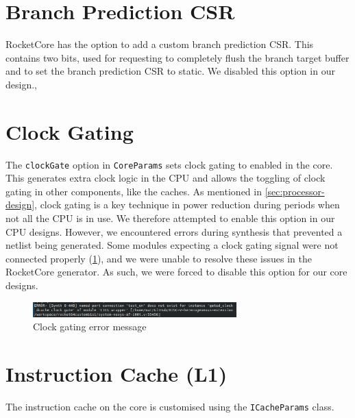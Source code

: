 \section{Branch Prediction CSR}
RocketCore has the option to add a custom branch prediction CSR. This contains two bits, used for requesting to completely flush the branch target buffer and to set the branch prediction CSR to static. We disabled this option in our design.,

\section{Clock Gating}
The \texttt{clockGate} option in \texttt{CoreParams} sets clock gating to enabled in the core. This generates extra clock logic in the CPU and allows the toggling of clock gating in other components, like the caches. As mentioned in \ref{sec:processor-design}, clock gating is a key technique in power reduction during periods when not all the CPU is in use. We therefore attempted to enable this option in our CPU designs. However, we encountered errors during synthesis that prevented a netlist being generated. Some modules expecting a clock gating signal were not connected properly (\ref{fig:clock_fail}), and we were unable to resolve these issues in the RocketCore generator. As such, we were forced to disable this option for our core designs.

\begin{figure}
    \centering
    \includegraphics[width=0.7\textwidth]{img/clock_gate_fail.png}
    \caption{Clock gating error message}
    \label{fig:clock_fail}
\end{figure}

\section{Instruction Cache (L1)}
The instruction cache on the core is customised using the \texttt{ICacheParams} class.

